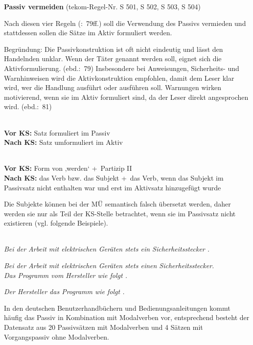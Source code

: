 \begin{description}[font=\normalfont\bfseries]
\item [Beschreibung der KS-Regel:] \textbf{Passiv vermeiden} (tekom-Regel-Nr. S 501, S 502, S 503, S 504)

Nach diesen vier Regeln (\citealt{tekom2013}:~79ff.) soll die Verwendung des Passivs vermieden und stattdessen sollen die Sätze im Aktiv formuliert werden.

Begründung: Die Passivkonstruktion ist oft nicht eindeutig und lässt den Handelnden unklar. Wenn der Täter genannt werden soll, eignet sich die Aktivformulierung. (ebd.:~79) Insbesondere bei Anweisungen, Sicherheits- und Warnhinweisen wird die Aktivkonstruktion empfohlen, damit dem Leser klar wird, wer die Handlung ausführt oder ausführen soll. Warnungen wirken motivierend, wenn sie im Aktiv formuliert sind, da der Leser direkt angesprochen wird. (ebd.:~81)

\item[Umsetzungsmuster:]
~\\
\textbf{Vor KS:} Satz formuliert im Passiv\\
\textbf{Nach KS:} Satz umformuliert im Aktiv

\item[KS-Stelle]
~\\
\textbf{Vor KS:} Form von ‚werden‘ +~Partizip II\\
\textbf{Nach KS:} das Verb bzw. das Subjekt +~das Verb, wenn das Subjekt im Passivsatz nicht enthalten war und erst im Aktivsatz hinzugefügt wurde

Die Subjekte können bei der MÜ semantisch falsch übersetzt werden, daher werden sie nur als Teil der KS-Stelle betrachtet, wenn sie im Passivsatz nicht existieren (vgl. folgende Beispiele).

\item[Beispiele]
~\\
\textit{Bei der Arbeit mit elektrischen Geräten  stets ein Sicherheitsstecker .}

\textit{Bei der Arbeit mit elektrischen Geräten  stets einen Sicherheitsstecker.}
~\\
\textit{Das Programm  vom Hersteller wie folgt .}

\textit{Der Hersteller  das Programm wie folgt .}

\item[Aufteilung der Testsätze:]
In den deutschen Benutzerhandbüchern und Bedienungsanleitungen kommt häufig das Passiv in Kombination mit Modalverben vor, entsprechend besteht der Datensatz aus 20 Passivsätzen mit Modalverben und 4 Sätzen mit Vorgangspassiv ohne Modalverben.

\end{description}

